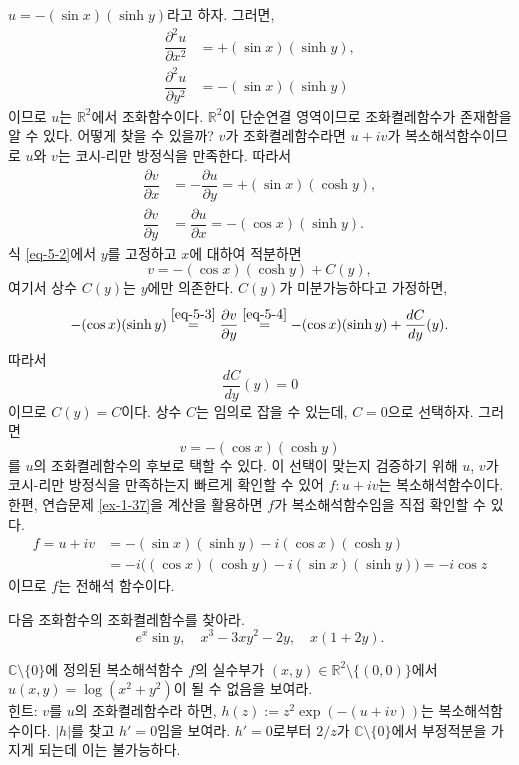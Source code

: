 \begin{saltexample}[label=example-5-5]{}{}
$u=-(\sin x)(\sinh y)$라고 하자. 그러면,
\begin{align*}
\dfrac{\partial^2 u}{\partial x^2} &= + (\sin x)(\sinh y), \\
\dfrac{\partial^2 u}{\partial y^2} &= - (\sin x)(\sinh y)
\end{align*}
이므로 $u$는 $\mathbb R^2$에서 조화함수이다.
$\mathbb R^2$이 단순연결 영역이므로 조화켤레함수가 존재함을 알 수 있다.
어떻게 찾을 수 있을까?
$v$가 조화켤레함수라면 $u+iv$가 복소해석함수이므로
$u$와 $v$는 코시-리만 방정식을 만족한다. 따라서 
\begin{align}
\dfrac{\partial v}{\partial x} &= -\dfrac{\partial u}{\partial y} = +(\sin x)(\cosh y),
\label{eq-5-2} \\
\dfrac{\partial v}{\partial y} &= \dfrac{\partial u}{\partial x} = -(\cos x)(\sinh y). 
\label{eq-5-3} 
\end{align}
식 \eqref{eq-5-2}에서 $y$를 고정하고 $x$에 대하여 적분하면
\begin{equation} \label{eq-5-4}
v = - (\cos x)(\cosh y) + C(y),
\end{equation}
여기서 상수 $C(y)$는 $y$에만 의존한다.
$C(y)$가 미분가능하다고 가정하면,
\[
- (\cos x)(\sinh y) \stackrel{\eqref{eq-5-3}}{=}
 \dfrac{\partial v}{\partial y} \stackrel{\eqref{eq-5-4}}{=}
- (\cos x)(\sinh y)  + \dfrac{dC}{dy}(y).
\]
따라서
\[
\dfrac{dC}{dy}(y)=0
\]
이므로 $C(y)=C$이다. 
상수 $C$는 임의로 잡을 수 있는데, $C=0$으로 선택하자.
그러면 
\[
v = -(\cos x)(\cosh y)
\]
를 $u$의 조화켤레함수의 후보로 택할 수 있다.
이 선택이 맞는지 검증하기 위해 $u$, $v$가 코시-리만 방정식을 만족하는지 
빠르게 확인할 수 있어 $f:u+iv$는 복소해석함수이다.
한편, 연습문제 \ref{ex-1-37}을 계산을 활용하면
$f$가 복소해석함수임을 직접 확인할 수 있다.
\begin{align*}
f = u+iv &=  - (\sin x)(\sinh y) - i(\cos x)(\cosh y) \\
&= -i \Big( (\cos x)(\cosh y) - i(\sin x)(\sinh y) \Big)
= - i\cos z
\end{align*}
이므로 $f$는 전해석 함수이다.
\end{saltexample}


\begin{salt_exercise}\label{ex-5-4}
다음 조화함수의 조화켤레함수를 찾아라.
\[
e^x\sin y, \quad x^3-3xy^2-2y, \quad x(1+2y).
\]
\end{salt_exercise}

\begin{salt_exercise}\label{ex-5-5}
$\mathbb C\setminus\{0\}$에 정의된 복소해석함수 $f$의
실수부가 $(x,y)\in \mathbb R^2 \setminus\{(0,0)\}$에서 $u(x,y) = \log(x^2+y^2)$이
될 수 없음을 보여라.\\
힌트: $v$를 $u$의 조화켤레함수라 하면, $h(z) := z^2\exp(-(u+iv))$는
복소해석함수이다. $|h|$를 찾고 $h'=0$임을 보여라.
$h'=0$로부터 $2/z$가 $\mathbb C\setminus\{0\}$에서 부정적분을 가지게 되는데
이는 불가능하다.
\end{salt_exercise}


